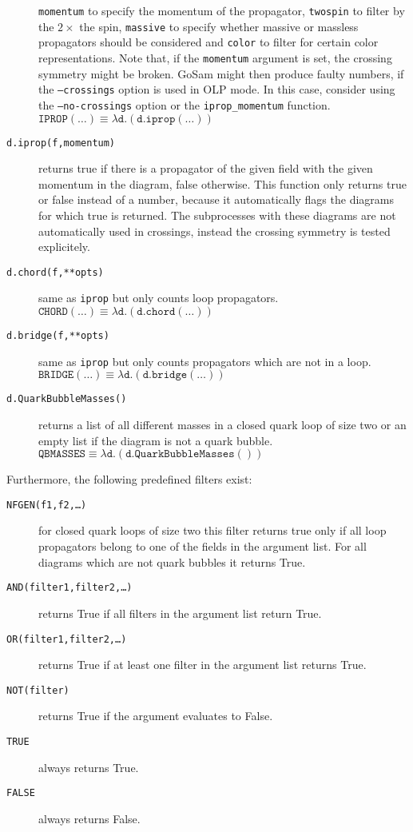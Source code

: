 \documentclass[11pt,a4paper]{refrep}
\begin{document}
\begin{description}
   \texttt{momentum} to specify the momentum of the propagator,
   \texttt{twospin} to filter by the $2\times$ the spin,
   \texttt{massive} to specify whether massive or massless propagators
   should be considered and \texttt{color} to filter for certain color
   representations. Note that, if the {\tt momentum} argument is set, the 
   crossing symmetry might be broken. GoSam might then produce faulty numbers,
   if the {\tt --crossings} option is used in OLP mode. In this case, consider 
   using the {\tt --no-crossings} option or the {\tt iprop\_momentum} function.\\
   $\mathtt{IPROP(\ldots)}\equiv
    \lambda\mathtt{d}.(\mathtt{d.iprop(\ldots)})$
\item[\texttt{d.iprop(f,momentum)}] returns true if there is a propagator of the
   given field with the given momentum in the diagram, false otherwise. This 
   function only returns true or false instead of a number, because it automatically
   flags the diagrams for which true is returned. The subprocesses with these
   diagrams are not automatically used in crossings, instead the crossing symmetry
   is tested explicitely. 
\item[\texttt{d.chord(f,**opts)}] same as \texttt{iprop}
   but only counts loop propagators.\\
   $\mathtt{CHORD(\ldots)}\equiv
    \lambda\mathtt{d}.(\mathtt{d.chord(\ldots)})$
\item[\texttt{d.bridge(f,**opts)}] same as \texttt{iprop}
   but only counts propagators which are not in a loop.\\
   $\mathtt{BRIDGE(\ldots)}\equiv
    \lambda\mathtt{d}.(\mathtt{d.bridge(\ldots)})$
\item[\texttt{d.QuarkBubbleMasses()}] returns a list of
   all different masses in a closed quark loop of size two
   or an empty list if the diagram is not a quark bubble.\\
   $\mathtt{QBMASSES}\equiv
    \lambda\mathtt{d}.(\mathtt{d.QuarkBubbleMasses()})$
\end{description}

Furthermore, the following predefined filters exist:
\begin{description}
\item[\texttt{NFGEN(f1,f2,\ldots)}] for closed quark loops of size two
   this filter returns true only if all loop propagators belong to one
   of the fields in the argument list. For all diagrams which are not
   quark bubbles it returns True.
\item[\texttt{AND(filter1,filter2,\ldots)}] returns True if all filters
   in the argument list return True.
\item[\texttt{OR(filter1,filter2,\ldots)}] returns True if at least one filter
   in the argument list returns True.
\item[\texttt{NOT(filter)}] returns True if the argument evaluates to False.
\item[\texttt{TRUE}] always returns True.
\item[\texttt{FALSE}] always returns False.
\end{description}
\end{document}
